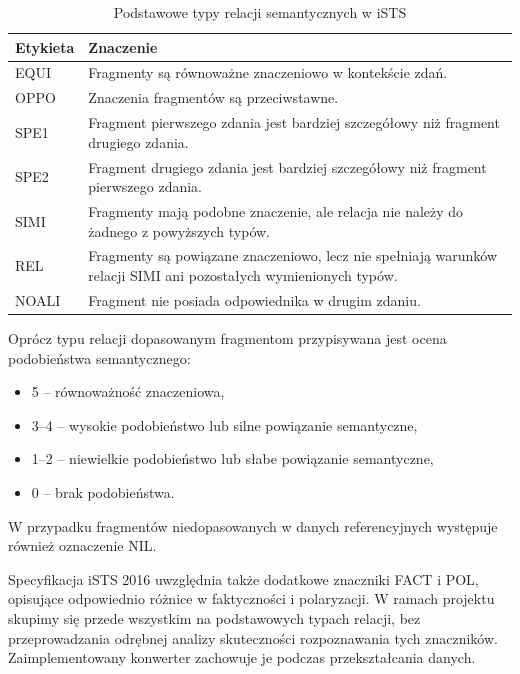\documentclass[a4paper,10pt]{article}
\begin{document}
\begin{table}[htbp]
    \centering
    \caption{Podstawowe typy relacji semantycznych w iSTS}
    \begin{tabular}{lp{12cm}}
        \toprule
        Etykieta & Znaczenie \\
        \midrule
        EQUI & Fragmenty są równoważne znaczeniowo
        w kontekście zdań. \\

        OPPO & Znaczenia fragmentów są przeciwstawne. \\

        SPE1 & Fragment pierwszego zdania jest bardziej
        szczegółowy niż fragment drugiego zdania. \\

        SPE2 & Fragment drugiego zdania jest bardziej
        szczegółowy niż fragment pierwszego zdania. \\

        SIMI & Fragmenty mają podobne znaczenie, ale
        relacja nie należy do żadnego z powyższych typów. \\

        REL & Fragmenty są powiązane znaczeniowo, lecz
        nie spełniają warunków relacji SIMI ani
        pozostałych wymienionych typów. \\

        NOALI & Fragment nie posiada odpowiednika
        w drugim zdaniu. \\
        \bottomrule
    \end{tabular}
\end{table}

Oprócz typu relacji dopasowanym fragmentom przypisywana
jest ocena podobieństwa semantycznego:

\begin{itemize}
    \item 5 -- równoważność znaczeniowa,
    \item 3--4 -- wysokie podobieństwo lub silne
    powiązanie semantyczne,
    \item 1--2 -- niewielkie podobieństwo lub słabe
    powiązanie semantyczne,
    \item 0 -- brak podobieństwa.
\end{itemize}

W przypadku fragmentów niedopasowanych w danych
referencyjnych występuje również oznaczenie NIL.

Specyfikacja iSTS 2016 uwzględnia także dodatkowe
znaczniki FACT i POL, opisujące odpowiednio różnice
w faktyczności i polaryzacji. W ramach projektu skupimy
się przede wszystkim na podstawowych typach relacji,
bez przeprowadzania odrębnej analizy skuteczności
rozpoznawania tych znaczników. Zaimplementowany
konwerter zachowuje je podczas przekształcania danych.
\end{document}
